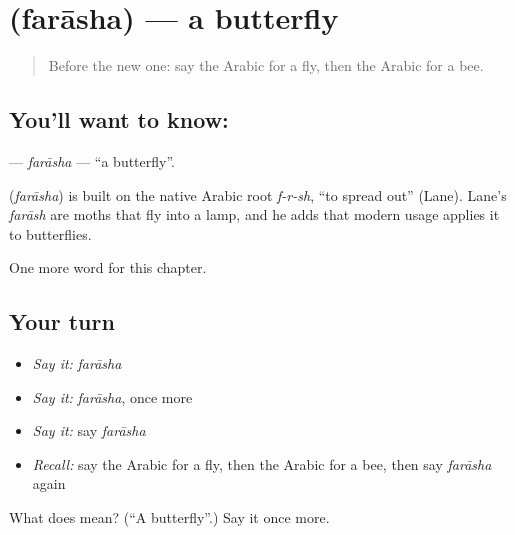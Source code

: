 \section[\texorpdfstring{\ar{فراشة} (farāsha)}{فراشة (farāsha)}]{ (farāsha) — a butterfly}

\label{lesson:AR-C136-farasha}



\begin{quote}
Before the new one: say the Arabic for a fly, then the Arabic for a bee.
\end{quote}

\subsection*{You'll want to know: }
\textbf{} — \emph{farāsha} — \textquotedblleft{}a butterfly\textquotedblright{}.

\begin{cousinweb}
\textbf{} (\emph{farāsha}) is built on the native Arabic root \emph{f-r-sh}, \textquotedblleft{}to spread out\textquotedblright{} (Lane). Lane's \emph{farāsh} are moths that fly into a lamp, and he adds that modern usage applies it to butterflies.
\end{cousinweb}

\begin{grammarlens}[title={What you've built}]
One more word for this chapter.
\end{grammarlens}

\subsection*{Your turn}
\begin{itemize}
\raggedright
  \item \emph{Say it:} \emph{farāsha}
  \item \emph{Say it:} \emph{farāsha}, once more
  \item \emph{Say it:} say \emph{farāsha}
  \item \emph{Recall:} say the Arabic for a fly, then the Arabic for a bee, then say \emph{farāsha} again
\end{itemize}

\begin{tcolorbox}[breakable,colback=teal!4,colframe=teal!35!black,title={Before you move on}]
What does  mean? (\textquotedblleft{}A butterfly\textquotedblright{}.) Say it once more.
\end{tcolorbox}
